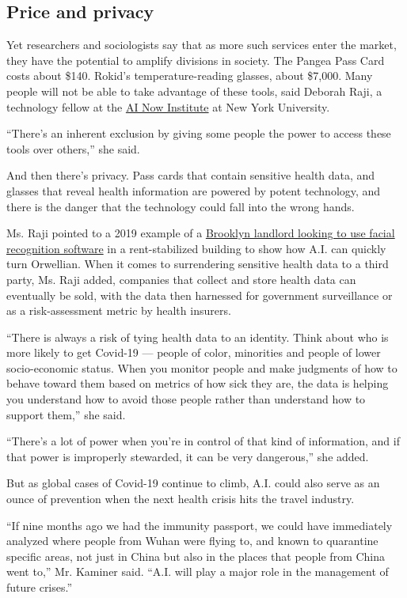 \hypertarget{price-and-privacy}{%
\subsection{Price and privacy}\label{price-and-privacy}}

Yet researchers and sociologists say that as more such services enter
the market, they have the potential to amplify divisions in society. The
Pangea Pass Card costs about \$140. Rokid's temperature-reading glasses,
about \$7,000. Many people will not be able to take advantage of these
tools, said Deborah Raji, a technology fellow at the
\href{https://ainowinstitute.org/}{AI Now Institute} at New York
University.

``There's an inherent exclusion by giving some people the power to
access these tools over others,'' she said.

And then there's privacy. Pass cards that contain sensitive health data,
and glasses that reveal health information are powered by potent
technology, and there is the danger that the technology could fall into
the wrong hands.

Ms. Raji pointed to a 2019 example of a
\href{https://www.nytimes.com/2019/03/28/nyregion/rent-stabilized-buildings-facial-recognition.html}{Brooklyn
landlord looking to use facial recognition software} in a
rent-stabilized building to show how A.I. can quickly turn Orwellian.
When it comes to surrendering sensitive health data to a third party,
Ms. Raji added, companies that collect and store health data can
eventually be sold, with the data then harnessed for government
surveillance or as a risk-assessment metric by health insurers.

``There is always a risk of tying health data to an identity. Think
about who is more likely to get Covid-19 --- people of color, minorities
and people of lower socio-economic status. When you monitor people and
make judgments of how to behave toward them based on metrics of how sick
they are, the data is helping you understand how to avoid those people
rather than understand how to support them,'' she said.

``There's a lot of power when you're in control of that kind of
information, and if that power is improperly stewarded, it can be very
dangerous,'' she added.

But as global cases of Covid-19 continue to climb, A.I. could also serve
as an ounce of prevention when the next health crisis hits the travel
industry.

``If nine months ago we had the immunity passport, we could have
immediately analyzed where people from Wuhan were flying to, and known
to quarantine specific areas, not just in China but also in the places
that people from China went to,'' Mr. Kaminer said. ``A.I. will play a
major role in the management of future crises.''

